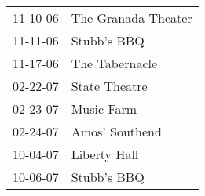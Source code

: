 \begin{supertabular}{p{0.07\textwidth}p{0.23\textwidth}}
 11-10-06 &  The Granada Theater \\
 11-11-06 &          Stubb's BBQ \\
 11-17-06 &       The Tabernacle \\
 02-22-07 &        State Theatre \\
 02-23-07 &           Music Farm \\
 02-24-07 &       Amos' Southend \\
 10-04-07 &         Liberty Hall \\
 10-06-07 &          Stubb's BBQ \\
\end{supertabular}
